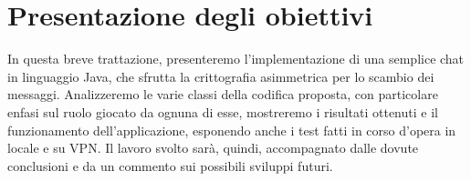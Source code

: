 \section{Presentazione degli obiettivi}
In questa breve trattazione, presenteremo l'implementazione di una semplice
chat in linguaggio Java, che sfrutta la crittografia asimmetrica per lo scambio dei
messaggi. Analizzeremo le varie classi della codifica proposta, con particolare enfasi
sul ruolo giocato da ognuna di esse, mostreremo i risultati ottenuti e
il funzionamento dell'applicazione, esponendo anche i test fatti in corso d'opera
in locale e su VPN. Il lavoro svolto sarà, quindi, accompagnato dalle dovute conclusioni e
da un commento sui possibili sviluppi futuri.